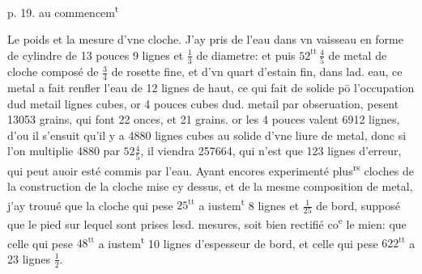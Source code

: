 \documentclass[11pt,a4paper]{article}
\begin{document}

p. 19. au commencem\textsuperscript{t}

Le poids et la mesure d'vne cloche. J'ay pris de l'eau dans vn vaisseau en forme de cylindre de 13 pouces 9 lignes et $\frac{1}{3}$ de diametre: et puis $52^{\text{tt}}\,\frac{4}{5}$ de metal de cloche composé de $\frac{3}{4}$ de rosette fine, et d'vn quart d'estain fin, dans lad. eau, ce metal a fait renfler l'eau de 12 lignes de haut, ce qui fait de solide pō l'occupation dud metail  lignes cubes, or 4 pouces cubes dud. metail par obseruation, pesent 13053 grains, qui font 22 onces, et 21 grains. or les 4 pouces valent 6912 lignes, d'ou il s'ensuit qu'il y a 4880 lignes cubes au solide d'vne liure de metal, donc si l'on multiplie 4880 par $52\frac{4}{5}$, il viendra 257664, qui n'est que 123 lignes d'erreur, qui peut auoir esté commis par l'eau. Ayant encores experimenté plus\textsuperscript{rs} cloches de la construction de la cloche mise cy dessus, et de la mesme composition de metal, j'ay trouué que la cloche qui pese $25^{\text{tt}}$ a iustem\textsuperscript{t} 8 lignes et $\frac{1}{25}$ de bord, supposé que le pied sur lequel sont prises lesd. mesures, soit bien rectifié co\textsuperscript{e} le mien: que celle qui pese $48^{\text{tt}}$ a iustem\textsuperscript{t} 10 lignes d'espesseur de bord, et celle qui pese $622^{\text{tt}}$ a 23 lignes $\frac{1}{2}$.
\end{document}
